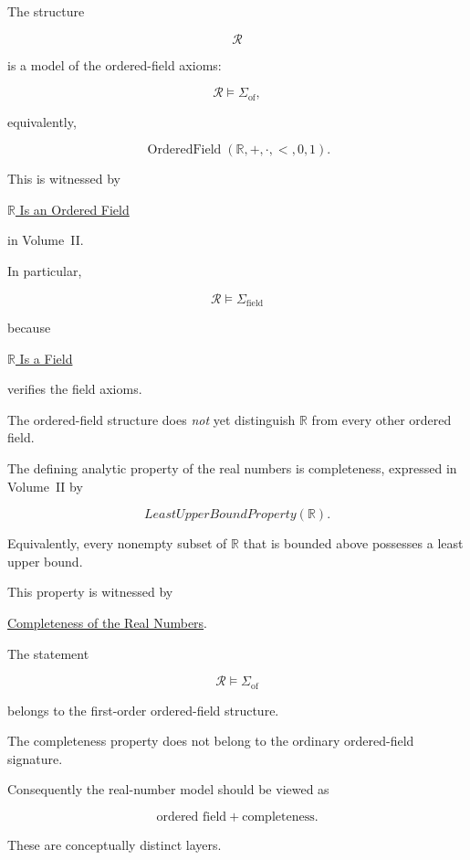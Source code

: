 
\begin{remark*}[Satisfaction]

The structure

\[
\mathcal R
\]

is a model of the ordered-field axioms:

\[
\mathcal R
\models
\Sigma_{\mathrm{of}},
\]

equivalently,

\[
\operatorname{OrderedField}
(\mathbb R,+,\cdot,<,0,1).
\]

This is witnessed by

\hyperref[thm:r-is-ordered-field]{$\mathbb R$ Is an Ordered Field}

in Volume~II.

In particular,

\[
\mathcal R
\models
\Sigma_{\mathrm{field}}
\]

because

\hyperref[thm:r-is-field]{$\mathbb R$ Is a Field}

verifies the field axioms.

\end{remark*}


\begin{remark*}

The ordered-field structure does \emph{not} yet distinguish
$\mathbb R$ from every other ordered field.

The defining analytic property of the real numbers is completeness, expressed
in Volume~II by

\[
LeastUpperBoundProperty(\mathbb R).
\]

Equivalently, every nonempty subset of $\mathbb R$ that is bounded above
possesses a least upper bound.

This property is witnessed by

\hyperref[ax:completeness-of-the-real-numbers]
{Completeness of the Real Numbers}.

\end{remark*}

\begin{remark*}

The statement

\[
\mathcal R
\models
\Sigma_{\mathrm{of}}
\]

belongs to the first-order ordered-field structure.

The completeness property does not belong to the ordinary ordered-field
signature.

Consequently the real-number model should be viewed as

\[
\text{ordered field}
+
\text{completeness}.
\]

These are conceptually distinct layers.

\end{remark*}

